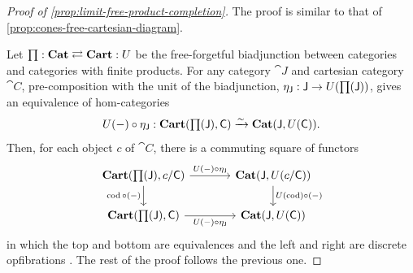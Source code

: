 \documentclass[11pt]{article}
\numberwithin{equation}{section}
\begin{document}
\begin{proof}[Proof of \cref{prop:limit-free-product-completion}]
  The proof is similar to that of \cref{prop:cones-free-cartesian-diagram}.

  Let $\mathop{\textstyle\prod}: \mathbf{Cat} \rightleftarrows \mathbf{Cart}: U$ be the free-forgetful
  biadjunction between categories and categories with finite products. For any
  category $\cat{J}$ and cartesian category $\cat{C}$, pre-composition with the
  unit of the biadjunction, $\eta_{\mathsf{J}}: \mathsf{J} \to U(\mathop{\textstyle\prod}(\mathsf{J}))$,
  gives an equivalence of hom-categories
  \begin{equation*}
    U(-) \circ \eta_{\mathsf{J}}: \mathbf{Cart}(\mathop{\textstyle\prod}(\mathsf{J}), \mathsf{C})
      \xrightarrow{\sim} \mathbf{Cat}(\mathsf{J}, U(\mathsf{C})).
  \end{equation*}
  Then, for each object $c$ of $\cat{C}$, there is a commuting square of
  functors
  \begin{equation*}
    \begin{tikzcd}[column sep=large]
      {\Cart(\ProdComp(\cat{J}),c/\cat{C})} & {\Cat(\cat{J}, U(c/\cat{C}))} \\
      {\Cart(\ProdComp(\cat{J}),\cat{C})} & {\Cat(\cat{J}, U(\cat{C}))}
      \arrow["{U(-) \circ \eta_{\cat{J}}}", from=1-1, to=1-2]
      \arrow["{\cod \circ (-)}"', from=1-1, to=2-1]
      \arrow["{U(\cod) \circ (-)}", from=1-2, to=2-2]
      \arrow["{U(-) \circ \eta_{\cat{J}}}"', from=2-1, to=2-2]
    \end{tikzcd}
  \end{equation*}
  in which the top and bottom are equivalences and the left and right are
  discrete opfibrations \cite[Theorems 5.2 and 6.6]{patterson2023}. The rest of
  the proof follows the previous one.
\end{proof}
\end{document}
